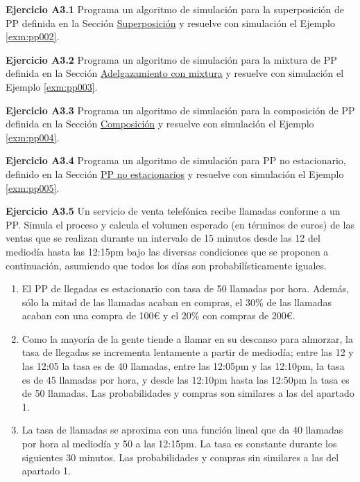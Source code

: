 \documentclass[
]{book}
\providecommand{\tightlist}{%
  \setlength{\itemsep}{0pt}\setlength{\parskip}{0pt}}
\theoremstyle{definition}
\theoremstyle{definition}
\theoremstyle{definition}
\theoremstyle{definition}
\theoremstyle{remark}
\begin{document}
\textbf{Ejercicio A3.1} Programa un algoritmo de simulación para la superposición de PP definida en la Sección \protect\hyperlink{superposicion_pp}{Superposición} y resuelve con simulación el Ejemplo \ref{exm:pp002}.

\textbf{Ejercicio A3.2} Programa un algoritmo de simulación para la mixtura de PP definida en la Sección \protect\hyperlink{adelgazamiento_pp}{Adelgazamiento con mixtura} y resuelve con simulación el Ejemplo \ref{exm:pp003}.

\textbf{Ejercicio A3.3} Programa un algoritmo de simulación para la composición de PP definida en la Sección \protect\hyperlink{composicion_pp}{Composición} y resuelve con simulación el Ejemplo \ref{exm:pp004}.

\textbf{Ejercicio A3.4} Programa un algoritmo de simulación para PP no estacionario, definido en la Sección \protect\hyperlink{pp_noestacionarios}{PP no estacionarios} y resuelve con simulación el Ejemplo \ref{exm:pp005}.

\textbf{Ejercicio A3.5} Un servicio de venta telefónica recibe llamadas conforme a un PP. Simula el proceso y calcula el volumen esperado (en términos de euros) de las ventas que se realizan durante un intervalo de 15 minutos desde las 12 del mediodía hasta las 12:15pm bajo las diversas condiciones que se proponen a continuación, asumiendo que todos los días son probabilísticamente iguales.

\begin{enumerate}
\def\labelenumi{\arabic{enumi}.}
\tightlist
\item
  El PP de llegadas es estacionario con tasa de 50 llamadas por hora. Además, sólo la mitad de las llamadas acaban en compras, el 30\% de las llamadas acaban con una compra de 100€ y el 20\% con compras de 200€.
\item
  Como la mayoría de la gente tiende a llamar en su descanso para almorzar, la tasa de llegadas se incrementa lentamente a partir de mediodía; entre las 12 y las 12:05 la tasa es de 40 llamadas, entre las 12:05pm y las 12:10pm, la tasa es de 45 llamadas por hora, y desde las 12:10pm hasta las 12:50pm la tasa es de 50 llamadas. Las probabilidades y compras son similares a las del apartado 1.
\item
  La tasa de llamadas se aproxima con una función lineal que da 40 llamadas por hora al mediodía y 50 a las 12:15pm. La tasa es constante durante los siguientes 30 minutos. Las probabilidades y compras sin similares a las del apartado 1.
\end{enumerate}
\end{document}
